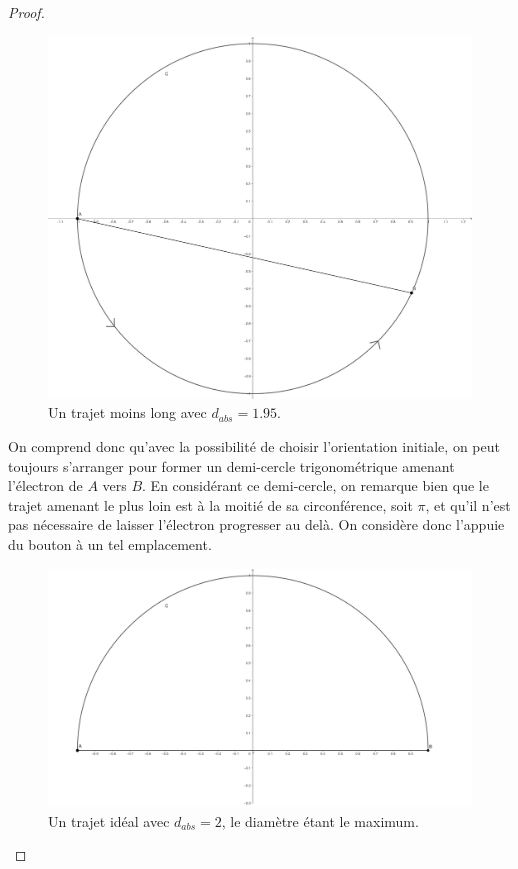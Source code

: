 \documentclass{amsart}
\theoremstyle{definition}
\theoremstyle{remark}
\numberwithin{equation}{section}
\begin{document}
\begin{proof}
  \begin{figure}[H]
    \centering
    \includegraphics[scale=0.13]{ab_circle2.png}
    \caption{Un trajet moins long avec $d_{abs}=1.95$.}
  \end{figure}

  On comprend donc qu'avec la possibilité de choisir l'orientation initiale, on peut toujours s'arranger pour former un demi-cercle trigonométrique amenant l'électron de $A$ vers $B$. En considérant ce demi-cercle, on remarque bien que le trajet 
  amenant le plus loin est à la moitié de sa circonférence, soit $\pi$, et qu'il n'est pas nécessaire de laisser l'électron progresser au delà. On considère donc l'appuie du bouton à un tel emplacement.

  \begin{figure}[H]
    \centering
    \includegraphics[scale=0.13]{ab_circle.png}
    \caption{Un trajet idéal avec $d_{abs}=2$, le diamètre étant le maximum.}
  \end{figure}

\end{proof}
\end{document}
